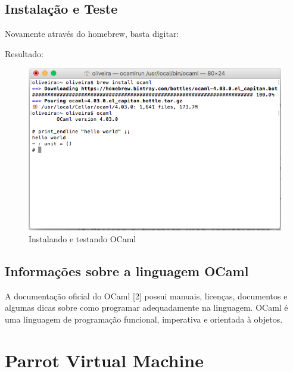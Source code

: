 \documentclass[12pt,a4paper,twoside]{report}
\begin{document}
\subsection{Instalação e Teste}
Novamente através do homebrew, basta digitar:
Resultado:
\begin{figure}[!ht]
\centering
\caption{Instalando e testando OCaml}
\includegraphics[scale=0.27]{imagens/brew-ocaml.png}
\end{figure}
\subsection{Informações sobre a linguagem OCaml}
A documentação oficial do OCaml [2] possui manuais, licenças, documentos e algumas dicas sobre como programar adequadamente na linguagem.
OCaml é uma linguagem de programação funcional, imperativa e orientada à objetos.

\section{Parrot Virtual Machine}
\end{document}
